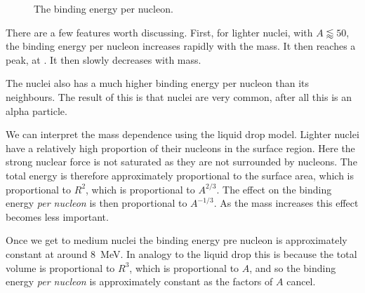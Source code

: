 \documentclass[fleqn]{NotesClass}
\begin{document}
    \begin{figure}
        \caption{The binding energy per nucleon.}
        \label{fig:binding energy per nucleon}
    \end{figure}
    
    There are a few features worth discussing.
    First, for lighter nuclei, with \(A \lessapprox 50\), the binding energy per nucleon increases rapidly with the mass.
    It then reaches a peak, at .
    It then slowly decreases with mass.
    
    The  nuclei also has a much higher binding energy per nucleon than its neighbours.
    The result of this is that  nuclei are very common, after all this is an alpha particle.
    
    We can interpret the mass dependence using the liquid drop model.
    Lighter nuclei have a relatively high proportion of their nucleons in the surface region.
    Here the strong nuclear force is not saturated as they are not surrounded by nucleons.
    The total energy is therefore approximately proportional to the surface area, which is proportional to \(R^2\), which is proportional to \(A^{2/3}\).
    The effect on the binding energy \emph{per nucleon} is then proportional to \(A^{-1/3}\).
    As the mass increases this effect becomes less important.
    
    Once we get to medium nuclei the binding energy pre nucleon is approximately constant at around \qty{8}{\MeV}.
    In analogy to the liquid drop this is because the total volume is proportional to \(R^3\), which is proportional to \(A\), and so the binding energy \emph{per nucleon} is approximately constant as the factors of \(A\) cancel.
    
\end{document}
